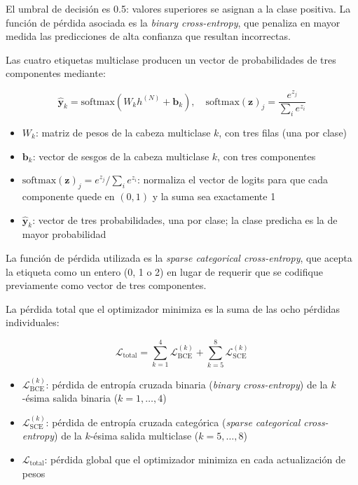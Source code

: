 \documentclass[12pt, a4paper]{report}
\newcommand{\ingles}[1]{\textit{#1}}
\begin{document}
El umbral de decisión es 0.5: valores superiores se asignan a la clase positiva. La función de pérdida asociada es la \ingles{binary cross-entropy}, que penaliza en mayor medida las predicciones de alta confianza que resultan incorrectas.

Las cuatro etiquetas multiclase producen un vector de probabilidades de tres componentes mediante:

\[
  \hat{\mathbf{y}}_k = \text{softmax}(W_k h^{(N)} + \mathbf{b}_k), \quad \text{softmax}(\mathbf{z})_j = \frac{e^{z_j}}{\sum_{i} e^{z_i}}
\]

\begin{itemize}
  \item $W_k$: matriz de pesos de la cabeza multiclase $k$, con tres filas (una por clase)
  \item $\mathbf{b}_k$: vector de sesgos de la cabeza multiclase $k$, con tres componentes
  \item $\text{softmax}(\mathbf{z})_j = e^{z_j}/\sum_i e^{z_i}$: normaliza el vector de logits para que cada componente quede en $(0,1)$ y la suma sea exactamente 1
  \item $\hat{\mathbf{y}}_k$: vector de tres probabilidades, una por clase; la clase predicha es la de mayor probabilidad
\end{itemize}

La función de pérdida utilizada es la \ingles{sparse categorical cross-entropy}, que acepta la etiqueta como un entero (0, 1 o 2) en lugar de requerir que se codifique previamente como vector de tres componentes.

La pérdida total que el optimizador minimiza es la suma de las ocho pérdidas individuales:

\[
  \mathcal{L}_{\text{total}} = \sum_{k=1}^{4} \mathcal{L}_{\text{BCE}}^{(k)} + \sum_{k=5}^{8} \mathcal{L}_{\text{SCE}}^{(k)}
\]

\begin{itemize}
  \item $\mathcal{L}_{\text{BCE}}^{(k)}$: pérdida de entropía cruzada binaria (\textit{binary cross-entropy}) de la $k$-ésima salida binaria ($k = 1,\ldots,4$)
  \item $\mathcal{L}_{\text{SCE}}^{(k)}$: pérdida de entropía cruzada categórica (\textit{sparse categorical cross-entropy}) de la $k$-ésima salida multiclase ($k = 5,\ldots,8$)
  \item $\mathcal{L}_{\text{total}}$: pérdida global que el optimizador minimiza en cada actualización de pesos
\end{itemize}
\end{document}
